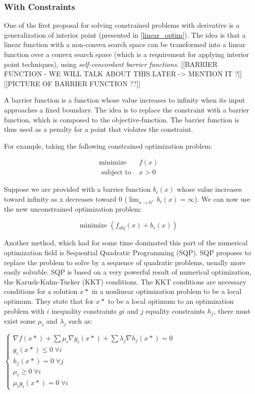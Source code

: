\subsubsection{With Constraints}

One of the first proposal for solving constrained problems with derivative is a generalization of interior point (presented in \ref{linear_optim}). The idea is that a linear function with a non-convex search space can be transformed into a linear function over a convex search space (which is a requirement for applying interior point techniques), using \emph{self-concordant barrier functions}.
[[BARRIER FUNCTION - WE WILL TALK ABOUT THIS LATER -> MENTION IT ?]]
[[PICTURE OF BARRIER FUNCTION ??]]

A barrier function is a function whose value increases to infinity when its input approaches a fixed boundary.
The idea is to replace the constraint with a barrier function, which is composed to the objective-function. The barrier function is thus used as a penalty for a point that violates the constraint.

For example, taking the following constrained optimization problem:

\begin{align*}
\text{minimize } &f(x)\\
\text{ subject to } &x > 0
\end{align*}

Suppose we are provided with a barrier function $b_c(x)$ whose value increases toward infinity as x decreases toward 0 ($\lim_{x \to 0^+}b_c(x) = \infty$). We can now use the new unconstrained optimization problem:

$$\text{minimize } (f_{obj}(x) + b_c(x))$$

Another method, which had for some time dominated this part of the numerical optimization field is Sequential Quadratic Programming (SQP). SQP proposes to replace the problem to solve by a sequence of quadratic problems, usually more easily solvable.
SQP is based on a very powerful result of numerical optimization, the Karush-Kuhn-Tucker (KKT) conditions. The KKT conditions are necessary conditions for a solution $x*$ in a nonlinear optimization problem to be a local optimum. They state that for $x*$ to be a local optimum to an optimization problem with $i$ inequality constraints $gi$ and $j$ equality constraints $h_j$, there must exist some $\mu_i$ and $\lambda_j$ such as:

$\left\{
 		 \begin{array}{l}
			\nabla f(x*) + \sum \mu_i \nabla g_i(x*) + \sum \lambda_j \nabla h_j(x*) = 0 \\
			g_i(x*) \leq 0 \;\forall i \\
			h_j(x*) = 0 \;\forall j \\
			\mu_i \geq 0 \;\forall i\\
			\mu_ig_i(x*) = 0 \;\forall i
		\end{array}
	\right. $
	
